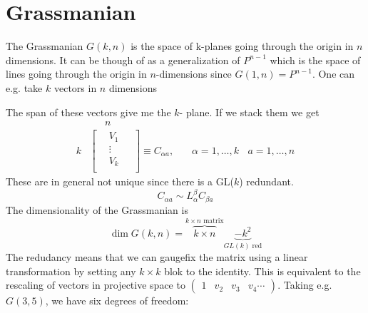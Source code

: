 \documentclass[a4paper,12pt]{article}
\begin{document}
\section{Grassmanian}
The Grassmanian $G(k,n)$ is the space of k-planes going through the origin in $n$ dimensions. It can be though of as a generalization of $P^{n-1}$ which is the space of lines going through the origin in $n$-dimensions since $G(1,n)=P^{n-1}$. One can e.g. take $k$ vectors in $n$ dimensions
\begin{figure}
	\centering
{}
\end{figure}
The span of these vectors give me the $k$- plane. If we stack them we get
\begin{equation}
\begin{aligned}
	&~~~~~~~n\\
	k&
\begin{bmatrix}
	~~~~V_1~~~~~\\
	~~~~\vdots ~~~~~\\
	~~~~V_k~~~~~\\
\end{bmatrix}\equiv C_{\alpha a},~~~~~~~~\alpha=1,\dots,k~~~~a=1,\dots,n
\end{aligned}
\end{equation}
These are in general not unique since there is a GL($k$) redundant.
\begin{equation}
C_{\alpha a}\sim L^{\beta}_\alpha C_{\beta a}
\end{equation}
The dimensionality of the Grassmanian is 
\begin{equation}
\dim G(k,n)=\overbrace{k\times n}^{k\times n \text{ matrix}}\underbrace{-k^2}_{GL(k) \text{ red}}
\end{equation}
The redudancy means that we can gaugefix the matrix using a linear transformation by setting any $k\times k$ blok to the identity. This is equivalent to the rescaling of vectors in projective space to $\begin{pmatrix}
1 & v_2 & v_3 & v_4 \cdots
\end{pmatrix}$. Taking e.g. $G(3,5)$, we have six degrees of freedom:
\end{document}
